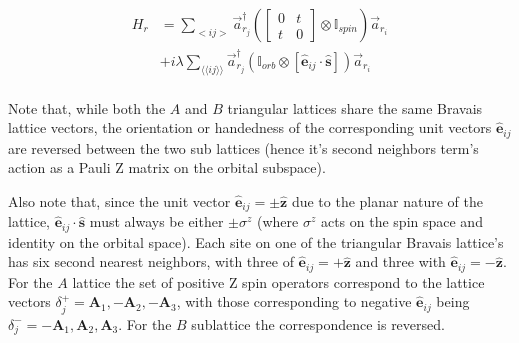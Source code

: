 \documentclass[10pt,a4paper]{article}\usepackage[]{graphicx}\usepackage[]{color}
\begin{document}
\begin{multicols}{2}
\begin{align*}
H_r &= 
\sum_{<ij>}
\vec{a}^{\dagger}_{r_j}\left(
\begin{bmatrix}
0& t\\
t & 0
\end{bmatrix}\otimes\mathbb{I}_{spin}\right)
\vec{a}_{r_i}\\
& +i\lambda\sum_{\langle\langle ij \rangle\rangle} \vec{a}^{\dagger}_{r_j}\left(\mathbb{I}_{orb}\otimes\left[ \hat{\mathbf{e}}_{ij}\cdot \hat{\mathbf{s}} \right]\right)\vec{a}_{r_i}\\
\end{align*}

Note that, while both the $A$ and $B$ triangular lattices share the same Bravais lattice vectors, the orientation or handedness of the corresponding unit vectors $\hat{\mathbf{e}}_{ij}$ are reversed between the two sub lattices (hence it's second neighbors term's action as a Pauli Z matrix on the orbital subspace).

Also note that, since the unit vector $\hat{\mathbf{e}}_{ij}=\pm \hat{\mathbf{z}}$ due to the planar nature of the lattice, $ \hat{\mathbf{e}}_{ij}\cdot \hat{\mathbf{s}}$ must always be either $\pm \sigma^z$ (where $\sigma^z$ acts on the spin space and identity on the orbital space). Each site on one of the triangular Bravais lattice's has six second nearest neighbors, with three of $\hat{\mathbf{e}}_{ij} = +\hat{\mathbf{z}}$ and three with $\hat{\mathbf{e}}_{ij} =-\hat{\mathbf{z}}$. For the $A$ lattice the set of positive Z spin operators correspond to the lattice vectors $\delta_j^+=\mathbf{A}_1,-\mathbf{A}_2,-\mathbf{A}_3$, with those corresponding to negative $\hat{\mathbf{e}}_{ij}$ being $\delta_j^-=-\mathbf{A}_1,\mathbf{A}_2,\mathbf{A}_3$. For the $B$ sublattice the correspondence is reversed.



\end{multicols}
\end{document}
